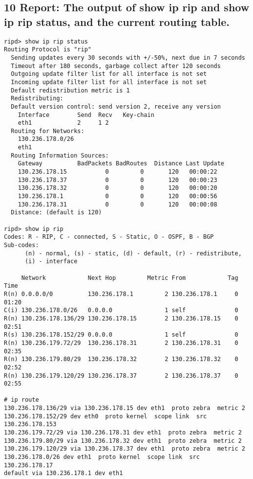 \subsection{10 Report: The output of show ip rip and show ip rip status, and the current routing table.}
\begin{verbatim}
ripd> show ip rip status
Routing Protocol is "rip"
  Sending updates every 30 seconds with +/-50%, next due in 7 seconds
  Timeout after 180 seconds, garbage collect after 120 seconds
  Outgoing update filter list for all interface is not set
  Incoming update filter list for all interface is not set
  Default redistribution metric is 1
  Redistributing:
  Default version control: send version 2, receive any version
    Interface        Send  Recv   Key-chain
    eth1             2     1 2
  Routing for Networks:
    130.236.178.0/26
    eth1
  Routing Information Sources:
    Gateway          BadPackets BadRoutes  Distance Last Update
    130.236.178.15           0         0       120   00:00:22
    130.236.178.37           0         0       120   00:00:23
    130.236.178.32           0         0       120   00:00:20
    130.236.178.1            0         0       120   00:00:56
    130.236.178.31           0         0       120   00:00:08
  Distance: (default is 120)

ripd> show ip rip
Codes: R - RIP, C - connected, S - Static, O - OSPF, B - BGP
Sub-codes:
      (n) - normal, (s) - static, (d) - default, (r) - redistribute,
      (i) - interface

     Network            Next Hop         Metric From            Tag Time
R(n) 0.0.0.0/0          130.236.178.1         2 130.236.178.1     0 01:20
C(i) 130.236.178.0/26   0.0.0.0               1 self              0
R(n) 130.236.178.136/29 130.236.178.15        2 130.236.178.15    0 02:51
R(s) 130.236.178.152/29 0.0.0.0               1 self              0
R(n) 130.236.179.72/29  130.236.178.31        2 130.236.178.31    0 02:35
R(n) 130.236.179.80/29  130.236.178.32        2 130.236.178.32    0 02:52
R(n) 130.236.179.120/29 130.236.178.37        2 130.236.178.37    0 02:55

# ip route
130.236.178.136/29 via 130.236.178.15 dev eth1  proto zebra  metric 2
130.236.178.152/29 dev eth0  proto kernel  scope link  src 130.236.178.153
130.236.179.72/29 via 130.236.178.31 dev eth1  proto zebra  metric 2
130.236.179.80/29 via 130.236.178.32 dev eth1  proto zebra  metric 2
130.236.179.120/29 via 130.236.178.37 dev eth1  proto zebra  metric 2
130.236.178.0/26 dev eth1  proto kernel  scope link  src 130.236.178.17
default via 130.236.178.1 dev eth1
\end{verbatim}

